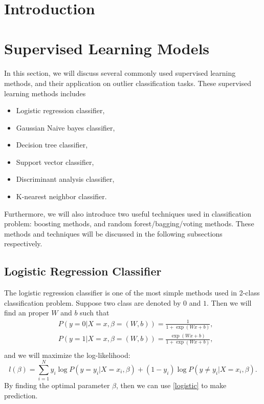 \documentclass[english]{article}
\author{\authorthing}
\title{\textbf{\titlemark}}
\begin{document}
\maketitle


\section{Introduction}

\section{Supervised Learning Models}
\par In this section, we will discuss several commonly used supervised learning methods, and their application on outlier classification tasks. These supervised learning methods includes
\begin{itemize}
	\item Logistic regression classifier,
	\item Gaussian Naive bayes classifier,
	\item Decision tree classifier,
	\item Support vector classifier,
	\item Discriminant analysis classifier,
	\item K-nearest neighbor classifier.
\end{itemize}
\par Furthermore, we will also introduce two useful techniques used in classification problem: boosting methods, and random forest/bagging/voting methods. These methods and techniques will be discussed in the following subsections respectively.

\subsection{Logistic Regression Classifier}
\par The logistic regression classifier is one of the most simple methods used in 2-class classification problem. Suppose two class are denoted by $0$ and $1$. Then we will find an proper $W$ and $b$ such that
\begin{equation}\label{logistic}
	\begin{aligned}
		&P(y=0|X=x, \beta=(W, b)) = \frac{1}{1 + \exp(Wx+b)},\\
		&P(y=1|X=x, \beta=(W, b)) = \frac{\exp(Wx+b)}{1 + \exp(Wx+b)},\\
	\end{aligned}
\end{equation}
and we will maximize the log-likelihood:
\begin{equation}
	l(\beta) = \sum_{i=1}^{N}y_{i}\log P(y=y_{i}|X=x_{i}, \beta) + (1-y_{i})\log P(y\neq y_{i}|X=x_{i}, \beta).
\end{equation}
By finding the optimal parameter $\beta$, then we can use \eqref{logistic} to make prediction.
\end{document}
